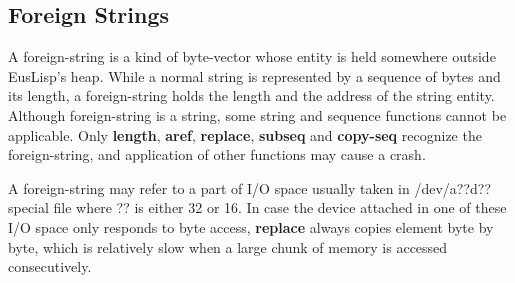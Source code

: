 \begin{refdesc}




\end{refdesc}

\subsection{Foreign Strings}
A foreign-string is a kind of byte-vector whose entity is held somewhere
outside EusLisp's heap.
While a normal string is represented by a sequence of bytes and its length,
a foreign-string holds the length and the address of the string entity.
Although foreign-string is a string,
some string and  sequence functions cannot be applicable.
Only {\bf length}, {\bf aref}, {\bf replace}, {\bf subseq} and {\bf copy-seq}
recognize the foreign-string, 
and application of other functions may cause a crash.

A foreign-string may refer to a part of I/O space usually
taken in /dev/a??d?? special file where ?? is either 32 or 16.
In case the device attached in one of these I/O space only responds
to byte access, {\bf replace} always copies element byte by byte,
which is relatively slow when a large chunk of memory is accessed
consecutively.

\begin{refdesc}

\end{refdesc}
\newpage

